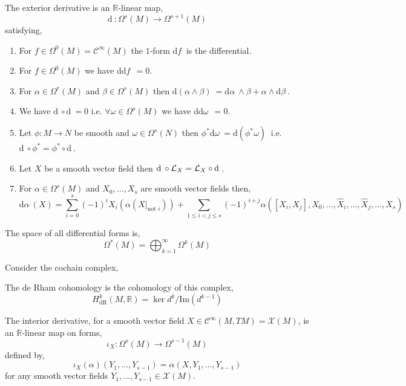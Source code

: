 \documentclass[12pt]{extarticle}
\newcommand{\R}{\mathbb{R}}
\renewcommand{\Im}[1]{\mathrm{Im}(#1)}
\renewcommand{\d}[1]{ \mathrm{d}#1 \:}
\theoremstyle{definition}
\newenvironment{definition}[1][Definition:]{\begin{trivlist}
\item[\hskip \labelsep {\bfseries #1}]}{\end{trivlist}}
\newcommand{\C}[1]{\mathcal{C}^{#1}}
\begin{document}
\begin{definition}
The exterior derivative is an $\R$-linear map,
\[ \d{} : \Omega^s(M) \to \Omega^{s+1}(M) \]
satisfying,
\begin{enumerate}
\item For $f \in \Omega^0(M) = \C{\infty}(M)$ the $1$-form $\d{f}$ is the differential.
\item For $f \in \Omega^0(M)$ we have $\d{\d{f}} = 0 $.
\item For $\alpha \in \Omega^r(M)$ and $\beta \in \Omega^s(M)$ then $\d{(\alpha \wedge \beta)} = \d{\alpha} \wedge \beta + \alpha \wedge \d{\beta}$. 
\item We have $\d{} \circ \d{} = 0$ i.e. $\forall \omega \in \Omega^{s}(M)$ we have $\d{\d{\omega}} = 0$.
\item Let $\phi : M \to N$ be smooth and $\omega \in \Omega^s(N)$ then $\phi^* \d{\omega} = \d{(\phi^* \omega)}$ i.e. $\d{} \circ \phi^* = \phi^* \circ \d{}$.
\item Let $X$ be a smooth vector field then $\d{} \circ \L_X = \L_X \circ \d{}$.
\item For $\alpha \in \Omega^s(M)$ and $X_0, \dots, X_s$ are smooth vector fields then,
\[ \d{\alpha}(X) = \sum_{i = 0}^s (-1)^i X_i \left( \alpha(X|_{\text{not } i}) \right) + \sum_{1 \le i < j \le s} (-1)^{i + j} \alpha([X_i, X_j], X_0, \dots, \hat{X}_i, \dots, \hat{X}_j, \dots, X_s) \] 
\end{enumerate}
\end{definition}

\begin{definition}
The space of all differential forms is,
\[ \Omega^{\ast}(M) = \bigoplus_{k = 1}^\infty \Omega^k(M) \]
\end{definition}

\begin{definition}
Consider the cochain complex,
\begin{center}
\end{center}
The de Rham cohomology is the cohomology of this complex,
\[ H_{\text{dR}}^k(M, \R) = \ker{d^k}/\Im{d^{k-1}} \]
\end{definition}

\begin{definition}
The interior derivative, for a smooth vector field $X \in \C{\infty}(M, TM) = \mathscr{X}(M)$, is an $\R$-linear map on forms,
\[ \iota_X : \Omega^s(M) \to \Omega^{s-1}(M) \]
defined by,
\[ \iota_X(\alpha)(Y_1, \dots, Y_{s-1}) = \alpha(X, Y_1, \dots, Y_{s-1}) \]
for any smooth vector fields $Y_1, \dots, Y_{s-1} \in \mathscr{X}(M)$. 
\end{definition}
\end{document}
